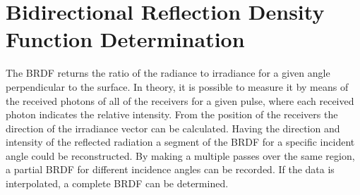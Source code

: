 \section{Bidirectional Reflection Density Function Determination}
\label{BRDFDet}
The \ac{BRDF} returns the ratio of the radiance to irradiance for a given angle perpendicular to the surface. In theory, it is possible to measure it by means of the received photons of all of the receivers for a given pulse, where each received photon indicates the relative intensity. From the position of the receivers the direction of the irradiance vector can be calculated.  Having the direction and intensity of the reflected radiation a segment of the \ac{BRDF} for a specific incident angle could be reconstructed.  By making a multiple passes over the same region, a partial \ac{BRDF} for different incidence angles can be recorded. If the data is interpolated, a complete \ac{BRDF} can be determined. 
